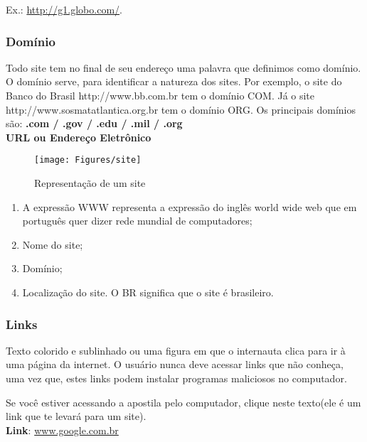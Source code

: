 \documentclass[hidelinks,12pt]{article}
\begin{document}
			Ex.: \url{http://g1.globo.com/}.\\
			
			
			\subsubsection{Domínio}
			
			Todo site tem no final de seu endereço uma palavra que definimos como domínio. O domínio serve, para identificar a natureza dos sites. Por exemplo, o site do Banco do Brasil http://www.bb.com.br tem o domínio COM. Já o site http://www.sosmatatlantica.org.br tem o domínio ORG. Os principais domínios são: \textbf{.com / .gov / .edu / .mil / .org}\\
			
			 \textbf{URL ou Endereço Eletrônico}
			
			\begin{figure}[!h]
				\centering
				\texttt{[image: Figures/site]}
				\label{fig:site}
				\caption{Representação de um site}
			\end{figure}
			
			\begin{enumerate}
				\item A expressão WWW representa a expressão do inglês world wide web que em português quer dizer rede mundial de computadores;
				
				\item Nome do site;
				
				\item Domínio;
				
				\item Localização do site. O BR significa que o site é brasileiro.
				
			\end{enumerate}
		
		\subsubsection{Links}
			Texto colorido e sublinhado ou uma figura em que o internauta clica para ir à uma página da internet. O usuário nunca deve acessar links que não conheça, uma vez que, estes links podem instalar programas maliciosos no computador.
			
			Se você estiver acessando a apostila pelo computador, clique neste texto(ele é um link que te levará para um site).\\
			\textbf{Link}: \url{www.google.com.br}	
			
\end{document}
